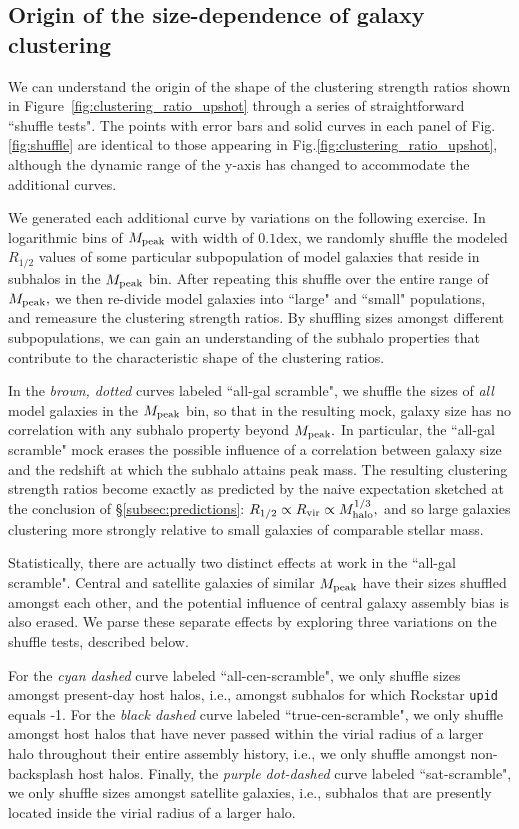 \documentclass[usenatbib,usegraphicx,letterpaper]{mn2e}
\newcommand{\rhalf}{R_{1/2}}
\newcommand{\mpeak}{M_{\rm peak}}
\newcommand{\mhalo}{M_{\rm halo}}
\newcommand{\rvir}{R_{\rm vir}}
\begin{document}
\subsection{Origin of the size-dependence of galaxy clustering}
\label{subsec:shuffle_tests}

We can understand the origin of the shape of the clustering strength ratios shown in Figure~\ref{fig:clustering_ratio_upshot} through a series of straightforward ``shuffle tests". The points with error bars and solid curves in each panel of Fig.\ref{fig:shuffle} are identical to those appearing in Fig.\ref{fig:clustering_ratio_upshot}, although the dynamic range of the y-axis has changed to accommodate the additional curves. 

We generated each additional curve by variations on the following exercise. In logarithmic bins of $\mpeak$ with width of $0.1$dex, we randomly shuffle the modeled $\rhalf$ values of some particular subpopulation of model galaxies that reside in subhalos in the $\mpeak$ bin. After repeating this shuffle over the entire range of $\mpeak,$ we then re-divide model galaxies into ``large" and ``small" populations, and remeasure the clustering strength ratios. By shuffling sizes amongst different subpopulations, we can gain an understanding of the subhalo properties that contribute to the characteristic shape of the clustering ratios. 

In the {\em brown, dotted} curves labeled ``all-gal scramble", we shuffle the sizes of {\em all} model galaxies in the $\mpeak$ bin, so that in the resulting mock, galaxy size has no correlation with any subhalo property beyond $\mpeak.$ In particular, the ``all-gal scramble" mock erases the possible influence of a correlation between galaxy size and the redshift at which the subhalo attains peak mass. The resulting clustering strength ratios become exactly as predicted by the naive expectation sketched at the conclusion of \S\ref{subsec:predictions}: $\rhalf\propto\rvir\propto\mhalo^{1/3},$ and so large galaxies clustering more strongly relative to small galaxies of comparable stellar mass. 

Statistically, there are actually two distinct effects at work in the ``all-gal scramble".  Central and satellite galaxies of similar $\mpeak$ have their sizes shuffled amongst each other, and the potential influence of central galaxy assembly bias is also erased. We parse these separate effects by exploring three variations on the shuffle tests, described below. 

For the {\em cyan dashed} curve labeled ``all-cen-scramble", we only shuffle sizes amongst present-day host halos, i.e., amongst subhalos for which Rockstar {\tt upid} equals -1. For the {\em black dashed} curve labeled ``true-cen-scramble", we only shuffle amongst host halos that have never passed within the virial radius of a larger halo throughout their entire assembly history, i.e., we only shuffle amongst non-backsplash host halos. Finally, the {\em purple dot-dashed} curve labeled ``sat-scramble", we only shuffle sizes amongst satellite galaxies, i.e., subhalos that are presently located inside the virial radius of a larger halo. 
\end{document}
